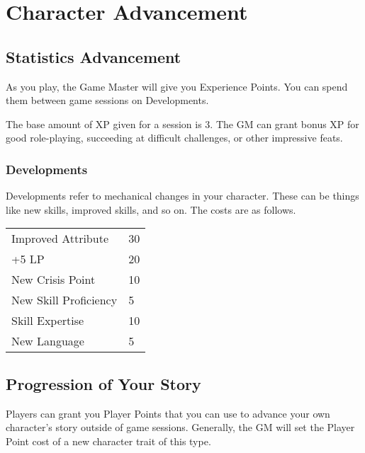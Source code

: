 \chapter{Character Advancement}

\begin{multicols}{2}

\section{Statistics Advancement}

As you play, the Game Master will give you Experience Points. You
can spend them between game sessions on Developments.

The base amount of XP given for a session is 3. The GM can grant bonus
XP for good role-playing, succeeding at difficult challenges, or other
impressive feats.

\subsection{Developments}

Developments refer to mechanical changes in your character. These can
be things like new skills, improved skills, and so on. The costs are
as follows.

\begin{center}
{
\begin{xtabular}{|l|l|}
Improved Attribute & 30 \\
+5 LP & 20 \\
New Crisis Point & 10 \\
New Skill Proficiency & 5 \\
Skill Expertise & 10 \\
New Language & 5 \\
\hline
\end{xtabular}
}
\end{center}

\section{Progression of Your Story}

Players can grant you Player Points that you can use to advance your own
character's story outside of game sessions. Generally, the GM will set the
Player Point cost of a new character trait of this type.

\end{multicols}
